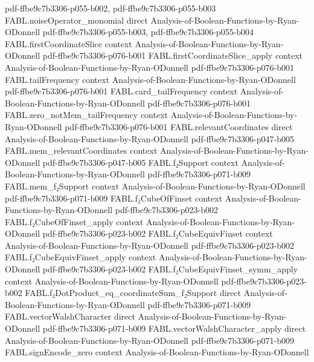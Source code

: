 \begin{theorem}
  {pdf-ffbe9c7b3306-p055-b002,
    pdf-ffbe9c7b3306-p055-b003}
\proofstep
  {FABL.noiseOperator_monomial}
  {direct}
  {Analysis-of-Boolean-Functions-by-Ryan-ODonnell}
  {pdf-ffbe9c7b3306-p055-b003,
    pdf-ffbe9c7b3306-p055-b004}
\proofstep
  {FABL.firstCoordinateSlice}
  {context}
  {Analysis-of-Boolean-Functions-by-Ryan-ODonnell}
  {pdf-ffbe9c7b3306-p076-b001}
\proofstep
  {FABL.firstCoordinateSlice_apply}
  {context}
  {Analysis-of-Boolean-Functions-by-Ryan-ODonnell}
  {pdf-ffbe9c7b3306-p076-b001}
\proofstep
  {FABL.tailFrequency}
  {context}
  {Analysis-of-Boolean-Functions-by-Ryan-ODonnell}
  {pdf-ffbe9c7b3306-p076-b001}
\proofstep
  {FABL.card_tailFrequency}
  {context}
  {Analysis-of-Boolean-Functions-by-Ryan-ODonnell}
  {pdf-ffbe9c7b3306-p076-b001}
\proofstep
  {FABL.zero_notMem_tailFrequency}
  {context}
  {Analysis-of-Boolean-Functions-by-Ryan-ODonnell}
  {pdf-ffbe9c7b3306-p076-b001}
\proofstep
  {FABL.relevantCoordinates}
  {direct}
  {Analysis-of-Boolean-Functions-by-Ryan-ODonnell}
  {pdf-ffbe9c7b3306-p047-b005}
\proofstep
  {FABL.mem_relevantCoordinates}
  {context}
  {Analysis-of-Boolean-Functions-by-Ryan-ODonnell}
  {pdf-ffbe9c7b3306-p047-b005}
\proofstep
  {FABL.f₂Support}
  {context}
  {Analysis-of-Boolean-Functions-by-Ryan-ODonnell}
  {pdf-ffbe9c7b3306-p071-b009}
\proofstep
  {FABL.mem_f₂Support}
  {context}
  {Analysis-of-Boolean-Functions-by-Ryan-ODonnell}
  {pdf-ffbe9c7b3306-p071-b009}
\proofstep
  {FABL.f₂CubeOfFinset}
  {context}
  {Analysis-of-Boolean-Functions-by-Ryan-ODonnell}
  {pdf-ffbe9c7b3306-p023-b002}
\proofstep
  {FABL.f₂CubeOfFinset_apply}
  {context}
  {Analysis-of-Boolean-Functions-by-Ryan-ODonnell}
  {pdf-ffbe9c7b3306-p023-b002}
\proofstep
  {FABL.f₂CubeEquivFinset}
  {context}
  {Analysis-of-Boolean-Functions-by-Ryan-ODonnell}
  {pdf-ffbe9c7b3306-p023-b002}
\proofstep
  {FABL.f₂CubeEquivFinset_apply}
  {context}
  {Analysis-of-Boolean-Functions-by-Ryan-ODonnell}
  {pdf-ffbe9c7b3306-p023-b002}
\proofstep
  {FABL.f₂CubeEquivFinset_symm_apply}
  {context}
  {Analysis-of-Boolean-Functions-by-Ryan-ODonnell}
  {pdf-ffbe9c7b3306-p023-b002}
\proofstep
  {FABL.f₂DotProduct_eq_coordinateSum_f₂Support}
  {direct}
  {Analysis-of-Boolean-Functions-by-Ryan-ODonnell}
  {pdf-ffbe9c7b3306-p071-b009}
\proofstep
  {FABL.vectorWalshCharacter}
  {direct}
  {Analysis-of-Boolean-Functions-by-Ryan-ODonnell}
  {pdf-ffbe9c7b3306-p071-b009}
\proofstep
  {FABL.vectorWalshCharacter_apply}
  {direct}
  {Analysis-of-Boolean-Functions-by-Ryan-ODonnell}
  {pdf-ffbe9c7b3306-p071-b009}
\proofstep
  {FABL.signEncode_zero}
  {context}
  {Analysis-of-Boolean-Functions-by-Ryan-ODonnell}

\end{theorem}
